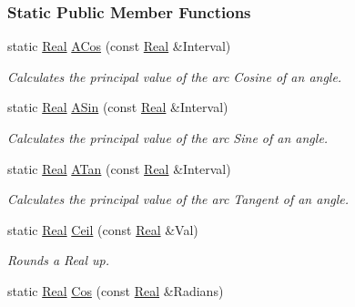 \subsubsection*{Static Public Member Functions}
\begin{DoxyCompactItemize}
\item 
static \hyperlink{namespacephys_af7eb897198d265b8e868f45240230d5f}{Real} \hyperlink{classphys_1_1MathTool_a42fe1e0bd7b1472567b126da4b512a5d}{ACos} (const \hyperlink{namespacephys_af7eb897198d265b8e868f45240230d5f}{Real} \&Interval)
\begin{DoxyCompactList}\small\item\em Calculates the principal value of the arc Cosine of an angle. \item\end{DoxyCompactList}\item 
static \hyperlink{namespacephys_af7eb897198d265b8e868f45240230d5f}{Real} \hyperlink{classphys_1_1MathTool_a89e9613eea236a9729a08500c47283d3}{ASin} (const \hyperlink{namespacephys_af7eb897198d265b8e868f45240230d5f}{Real} \&Interval)
\begin{DoxyCompactList}\small\item\em Calculates the principal value of the arc Sine of an angle. \item\end{DoxyCompactList}\item 
static \hyperlink{namespacephys_af7eb897198d265b8e868f45240230d5f}{Real} \hyperlink{classphys_1_1MathTool_ac421007a0a5c5e0b29b832f841327cb0}{ATan} (const \hyperlink{namespacephys_af7eb897198d265b8e868f45240230d5f}{Real} \&Interval)
\begin{DoxyCompactList}\small\item\em Calculates the principal value of the arc Tangent of an angle. \item\end{DoxyCompactList}\item 
static \hyperlink{namespacephys_af7eb897198d265b8e868f45240230d5f}{Real} \hyperlink{classphys_1_1MathTool_adddaab80e2e5d5a76e123f3ce491d3e7}{Ceil} (const \hyperlink{namespacephys_af7eb897198d265b8e868f45240230d5f}{Real} \&Val)
\begin{DoxyCompactList}\small\item\em Rounds a Real up. \item\end{DoxyCompactList}\item 
static \hyperlink{namespacephys_af7eb897198d265b8e868f45240230d5f}{Real} \hyperlink{classphys_1_1MathTool_ac6f9436baacafe1894f71728f11e2f58}{Cos} (const \hyperlink{namespacephys_af7eb897198d265b8e868f45240230d5f}{Real} \&Radians)

\end{DoxyCompactItemize}
